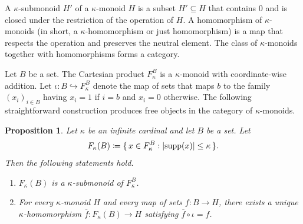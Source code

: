 \documentclass[a4paper,11pt,oneside]{amsart}
\newtheorem{prop}[teor]{Proposition}
\theoremstyle{remark}
\DeclareMathOperator{\supp}{supp}
\DeclarePairedDelimiter{\card}{\lvert}{\rvert}
\newcommand{\defit}[1]{\textsf{#1}}
\begin{document}
A \defit{$\kappa$-submonoid $H'$} of a $\kappa$-monoid $H$ is a subset $H' \subseteq H$ that contains $0$ and is closed under the restriction of the operation of $H$.
A \defit{homomorphism of $\kappa$-monoids} (in short, a \defit{$\kappa$-homomorphism} or just \defit{homomorphism}) is a map that respects the operation and preserves the neutral element.
The class of $\kappa$-monoids together with homomorphisms forms a category.

Let $B$ be a set.
The Cartesian product $F_{\kappa}^B$ is a $\kappa$-monoid with coordinate-wise addition.
Let $\iota\colon B \hookrightarrow F_\kappa^B$ denote the map of sets that maps $b$ to the family $(x_i)_{i \in B}$ having $x_i=1$ if $i=b$ and $x_i=0$ otherwise.
The following straightforward construction produces free objects in the category of $\kappa$-monoids.

\begin{prop} \label{p:free}
  Let $\kappa$ be an infinite cardinal and let $B$ be a set.
  Let
  \[
    F_{\kappa}(B) \coloneqq \{\, x \in F_\kappa^{B} : \card{\supp(x)} \le \kappa \,\}.
  \]
  Then the following statements hold.
  \begin{enumerate}
  \item \label{free:submonoid} $F_{\kappa}(B)$ is a $\kappa$-submonoid of $F_\kappa^B$.
    \item \label{free:up}  For every $\kappa$-monoid $H$ and every map of sets $f \colon B \to H$, there exists a 
  unique $\kappa$-homomorphism $\overline f \colon F_\kappa(B) \to H$  satisfying $\overline f \circ \iota = f$.
  \end{enumerate}
\end{prop}
\end{document}
